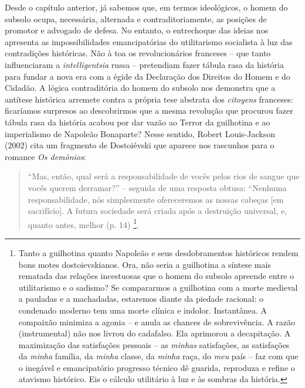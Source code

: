 Desde o capítulo anterior, já sabemos que, em termos ideológicos, o
homem do subsolo ocupa, necessária, alternada e contraditoriamente, as
posições de promotor e advogado de defesa. No entanto, o entrechoque das
ideias nos apresenta as impossibilidades emancipatórias do utilitarismo
socialista à luz das contradições históricas. Não à toa os
revolucionários franceses -- que tanto influenciaram a
\emph{intelligentsia} russa -- pretendiam fazer tábula rasa da história
para fundar a nova era com a égide da Declaração dos Direitos do Homem e
do Cidadão. A lógica contraditória do homem do subsolo nos demonstra que
a antítese histórica arremete contra a própria tese abstrata dos
\emph{citoyens} franceses: ficaríamos surpresos ao descobrirmos que a
mesma revolução que procurou fazer tábula rasa da história acabou por
dar vazão ao Terror da guilhotina e ao imperialismo de Napoleão
Bonaparte? Nesse sentido, Robert Louis-Jackson (2002) cita um fragmento
de Dostoiévski que aparece nos rascunhos para o romance \emph{Os
demônios}:

\begin{quote}
``Mas, então, qual será a responsabilidade de vocês pelos rios de sangue
que vocês querem derramar?'' -- seguida de uma resposta obtusa:
``Nenhuma responsabilidade, nós simplesmente ofereceremos as nossas
cabeças {[}em sacrifício{]}. A futura sociedade será criada após a
destruição universal, e, quanto antes, melhor (p. 14) \footnote{Tanto a
  guilhotina quanto Napoleão e seus desdobramentos históricos rendem
  bons motes dostoievskianos. Ora, não seria a guilhotina a síntese mais
  rematada das relações incestuosas que o homem do subsolo apreende
  entre o utilitarismo e o sadismo? Se compararmos a guilhotina com a
  morte medieval a pauladas e a machadadas, estaremos diante da piedade
  racional: o condenado moderno tem uma morte clínica e indolor.
  Instantânea. A compaixão minimiza a agonia -- e anula as chances de
  sobrevivência. A razão (instrumental) não nos livrou do cadafalso. Ela
  aprimorou a decapitação. A maximização das satisfações pessoais -- as
  \emph{minhas} satisfações, as satisfações da \emph{minha} família, da
  \emph{minha} classe, da \emph{minha} raça, do \emph{meu} país -- faz
  com que o inegável e emancipatório progresso técnico dê guarida,
  reproduza e refine o atavismo histórico. Eis o cálculo utilitário à
  luz e às sombras da história.}.
\end{quote}

